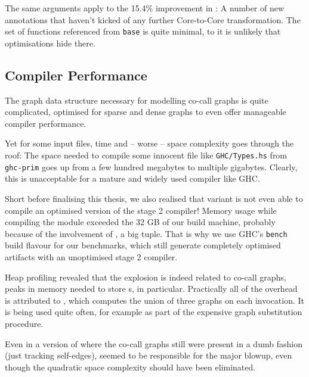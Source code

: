 The same arguments apply to the 15.4\% improvement in :
A number of new annotations that haven't kicked of any further Core-to-Core transformation.
The set of functions referenced from \texttt{base} is quite minimal, to it is unlikely that optimisations hide there.

\subsection{Compiler Performance}\label{sec:compperf}

The graph data structure necessary for modelling co-call graphs is quite complicated, optimised for sparse and dense graphs to even offer manageable compiler performance.

Yet for some input files, time and -- worse -- space complexity goes through the roof:
The space needed to compile some innocent file like \texttt{GHC/Types.hs} from \texttt{ghc-prim} goes up from a few hundred megabytes to multiple gigabytes.
Clearly, this is unacceptable for a mature and widely used compiler like GHC.

Short before finalising this thesis, we also realised that variant \varfull is not even able to compile an optimised version of the stage 2 compiler!
Memory usage while compiling the  module exceeded the 32 GB of our build machine, probably because of the involvement of , a big tuple.
That is why we use GHC's \texttt{bench} build flavour for our benchmarks, which still generate completely optimised artifacts with an unoptimised stage 2 compiler.

Heap profiling revealed that the explosion is indeed related to co-call graphs, peaks in memory needed to store s, in particular.
Practically all of the overhead is attributed to , which computes the union of three graphs on each invocation. 
It is being used quite often, for example as part of the expensive graph substitution procedure.

Even in a version of \varedges where the co-call graphs still were present in a dumb fashion (\eg just tracking self-edges),  seemed to be responsible for the major blowup, even though the quadratic space complexity should have been eliminated.

